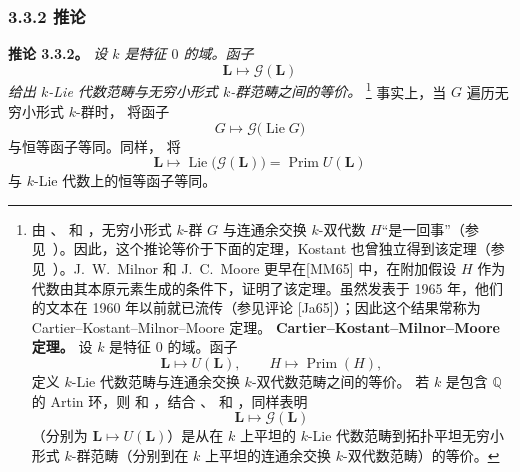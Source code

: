 
\subsubsection*{3.3.2 推论}
\label{sga3:VIIB:3.3.2}
\noindent\textbf{推论 3.3.2。}
{\itshape 设 \(k\) 是特征 \(0\) 的域。函子
\[
  \mathbf L\longmapsto\mathscr G(\mathbf L)
\]
给出 \(k\)-Lie 代数范畴与无穷小形式 \(k\)-群范畴之间的等价。}
\footnote{\label{sga3:VIIB:nde:131}由 、 和 ，无穷小形式 \(k\)-群 \(G\) 与连通余交换 \(k\)-双代数 \(H\)“是一回事”\textup{（参见\ ）}。因此，这个推论等价于下面的定理，Kostant 也曾独立得到该定理\textup{（参见\ ）}。J.~W.~Milnor 和 J.~C.~Moore 更早在\textup{[MM65]} 中，在附加假设 \(H\) 作为代数由其本原元素生成的条件下，证明了该定理。虽然发表于 1965 年，他们的文本在 1960 年以前就已流传\textup{（参见评论 [Ja65]）}；因此这个结果常称为 Cartier--Kostant--Milnor--Moore 定理。
\smallskip
\noindent\textbf{Cartier--Kostant--Milnor--Moore 定理。}
设 \(k\) 是特征 \(0\) 的域。函子
\[
  \mathbf L\longmapsto U(\mathbf L),
  \qquad
  H\longmapsto\operatorname{Prim}(H),
\]
定义 \(k\)-Lie 代数范畴与连通余交换 \(k\)-双代数范畴之间的等价。
\smallskip
若 \(k\) 是包含 \(\mathbb Q\) 的 Artin 环，则 \textup{} 和 ，结合 、 和 ，同样表明
\[
  \mathbf L\longmapsto\mathscr G(\mathbf L)
\]
\textup{（分别为 \(\mathbf L\mapsto U(\mathbf L)\)）}是从在 \(k\) 上平坦的 \(k\)-Lie 代数范畴到拓扑平坦无穷小形式 \(k\)-群范畴\textup{（分别到在 \(k\) 上平坦的连通余交换 \(k\)-双代数范畴）}的等价。}
事实上，当 \(G\) 遍历无穷小形式 \(k\)-群时， 将函子
\[
  G\longmapsto\mathscr G\bigl(\operatorname{Lie}G\bigr)
\]
与恒等函子等同。同样，\textup{} 将
\[
  \mathbf L
  \longmapsto
  \operatorname{Lie}\bigl(\mathscr G(\mathbf L)\bigr)
  =
  \operatorname{Prim}U(\mathbf L)
\]
与 \(k\)-Lie 代数上的恒等函子等同。
